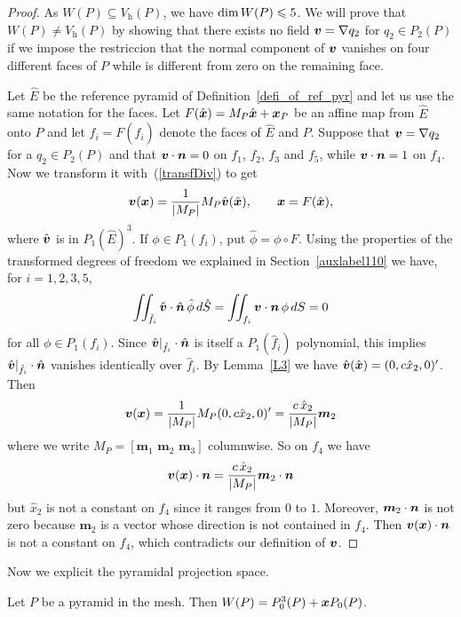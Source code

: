 \begin{proof}
As $W(P)\subseteq V_{\textit{h}}(P)$, we have $\mbox{dim\,}W(P)\leqslant 5$. 
We will prove that $W(P)\ne V_{\textit{h}}(P)$ by showing that there exists no field
$\boldsymbol{v}=\nabla q_2$ for $q_2\in P_2(P)$ if we impose the restriccion that the normal
component of $\boldsymbol{v}$ vanishes on four different faces of $P$ while is different from zero on
the remaining face.

Let $\hat E$ be the reference pyramid of Definition~\ref{defi_of_ref_pyr}  and
let us use the same notation for the faces. Let $F(\hat {\boldsymbol{x}}) = M_P \hat{\boldsymbol{x}} + \boldsymbol{x}_P$
be an affine map from $\hat E$ onto $P$ and let
$f_i=F(\hat f_i)$ denote the faces of $\hat E$ and $P$. Suppose
that $\boldsymbol{v}=\nabla q_2$ for a $q_2 \in P_2(P)$ and that
$\boldsymbol{v}\cdot\boldsymbol{n}=0$ on $f_1$, $f_2$, $f_3$ and $f_5$, while
$\boldsymbol{v}\cdot\boldsymbol{n}=1$ on $f_4$. Now we transform it with~(\ref{transfDiv}) to get
\begin{equation}\label{piola}
\boldsymbol{v}({\boldsymbol{x}}) = \frac1{|M_P|}M_P\hat{\boldsymbol{v}}(\hat{\boldsymbol{x}}), \qquad {\boldsymbol{x}}=F(\hat {\boldsymbol{x}}),
\end{equation}
where $\hat{\boldsymbol{v}}$ is in $P_1(\hat E)^3$. If $\phi\in P_1(f_i)$, put $\hat\phi = \phi\circ F$.
Using the properties of the transformed
degrees of freedom we explained in Section~\ref{auxlabel110} we have, for $i=1,2,3,5$,
\[
\iint_{\hat f_i}\hat{\boldsymbol{v}}\cdot {\hat{\boldsymbol{n}}}\,\hat\phi\,d\hat S = \iint_{f_i}\boldsymbol{v}\cdot {\boldsymbol{n}}\,\phi\,dS =0
\]
for all $\phi\in P_1(f_i)$.
Since $\hat{\boldsymbol{v}}|_{\hat f_i}\cdot {\hat{\boldsymbol{n}}}$ is itself a $P_1(\hat f_i)$ polynomial, 
this implies $\hat{\boldsymbol{v}}|_{\hat f_i}\cdot {\hat{\boldsymbol{n}}}$ vanishes identically over $\hat f_i$.
By Lemma~\ref{L3} we have $\hat{\boldsymbol{v}}(\hat{\boldsymbol{x}})=(0,c\hat x_2,0)'$. Then
\[
  \boldsymbol{v}({\boldsymbol{x}})=\frac1{|M_P|}M_P(0,c\hat x_2,0)' = \frac {c\,\hat x_2}{|M_P|}\boldsymbol{m}_2 
\]
where we write $M_P=[\boldsymbol{m}_1\,\,\boldsymbol{m}_2\,\,\boldsymbol{m}_3]$ 
columnwise. So on $f_4$ we have 
\[
	\boldsymbol{v}({\boldsymbol{x}})\cdot {\boldsymbol{n}}=\frac {c\,\hat x_2}{|M_P|}\boldsymbol{m}_2\cdot {\boldsymbol{n}} 
\]
but $\hat x_2$ is not a constant on $f_4$ since it ranges from $0$ to $1$. Moreover,
$\boldsymbol{m}_2\cdot {\boldsymbol{n}}$ is not zero because $\boldsymbol{m}_2$ is a 
vector whose direction is not contained in $f_4$.
Then $\boldsymbol{v}({\boldsymbol{x}})\cdot {\boldsymbol{n}}$ is not a constant on $f_4$, which contradicts our 
definition of $\boldsymbol{v}$.  
\end{proof}
Now we explicit the pyramidal projection space.
\begin{proposition}
Let $P$ be a pyramid in the mesh. Then $W(P)=P_0^3(P)+{\boldsymbol{x}} P_0(P)$.
\end{proposition}
